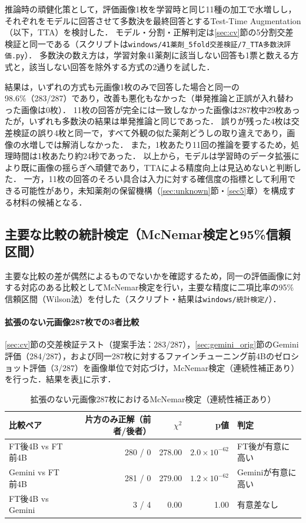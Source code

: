 \documentclass[dvipdfmx]{jsarticle}
\begin{document}
推論時の頑健化策として，評価画像1枚を学習時と同じ11種の加工で水増しし，それぞれをモデルに回答させて多数決を最終回答とするTest-Time Augmentation（以下，TTA）を検討した．
モデル・分割・正解判定は\ref{sec:cv}節の5分割交差検証と同一である（スクリプトは\texttt{windows/41薬剤\_5fold交差検証/7\_TTA多数決評価.py}）．
多数決の数え方は，学習対象41薬剤に該当しない回答も1票と数える方式と，該当しない回答を除外する方式の2通りを試した．

結果は，いずれの方式も元画像1枚のみで回答した場合と同一の98.6\%（283/287）であり，改善も悪化もなかった（単発推論と正誤が入れ替わった画像は0枚）．
11枚の回答が完全には一致しなかった画像は287枚中29枚あったが，いずれも多数決の結果は単発推論と同じであった．
誤りが残った4枚は交差検証の誤り4枚と同一で，すべて外観の似た薬剤どうしの取り違えであり，画像の水増しでは解消しなかった．
また，1枚あたり11回の推論を要するため，処理時間は1枚あたり約24秒であった．
以上から，モデルは学習時のデータ拡張により既に画像の揺らぎへ頑健であり，TTAによる精度向上は見込めないと判断した．
一方，11枚の回答のそろい具合は入力に対する確信度の指標として利用できる可能性があり，未知薬剤の保留機構（\ref{sec:unknown}節・\ref{sec5}章）を構成する材料の候補となる．

\subsection{主要な比較の統計検定（McNemar検定と95\%信頼区間）}\label{sec:stat}

主要な比較の差が偶然によるものでないかを確認するため，同一の評価画像に対する対応のある比較としてMcNemar検定を行い，主要な精度に二項比率の95\%信頼区間（Wilson法）を付した（スクリプト・結果は\texttt{windows/統計検定/}）．

\paragraph{拡張のない元画像287枚での3者比較}
\ref{sec:cv}節の交差検証テスト（提案手法：283/287），\ref{sec:gemini_orig}節のGemini評価（284/287），および同一287枚に対するファインチューニング前4Bのゼロショット評価（3/287）を画像単位で対応づけ，McNemar検定（連続性補正あり）を行った．結果を表\ref{tab:mcnemar}に示す．

\begin{table}[htbp]
\centering
\caption{拡張のない元画像287枚におけるMcNemar検定（連続性補正あり）}
\label{tab:mcnemar}
\small
\begin{tabular}{lrrrl}
\hline
比較ペア & 片方のみ正解（前者/後者） & $\chi^2$ & p値 & 判定 \\
\hline
FT後4B vs FT前4B & 280 / 0 & 278.00 & $2.0\times10^{-62}$ & FT後が有意に高い \\
Gemini vs FT前4B & 281 / 0 & 279.00 & $1.2\times10^{-62}$ & Geminiが有意に高い \\
FT後4B vs Gemini & 3 / 4 & 0.00 & 1.00 & 有意差なし \\
\hline
\end{tabular}
\end{table}
\end{document}
